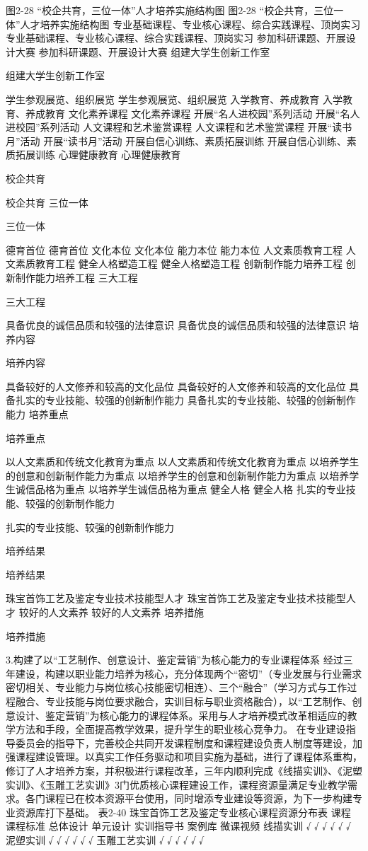 		图2-28   “校企共育，三位一体”人才培养实施结构图
图2-28   “校企共育，三位一体”人才培养实施结构图
专业基础课程、专业核心课程、综合实践课程、顶岗实习
专业基础课程、专业核心课程、综合实践课程、顶岗实习
参加科研课题、开展设计大赛
参加科研课题、开展设计大赛
组建大学生创新工作室

组建大学生创新工作室

学生参观展览、组织展览
学生参观展览、组织展览
入学教育、养成教育
入学教育、养成教育
文化素养课程
文化素养课程
  开展“名人进校园”系列活动
  开展“名人进校园”系列活动
人文课程和艺术鉴赏课程
人文课程和艺术鉴赏课程
开展“读书月”活动
开展“读书月”活动
开展自信心训练、素质拓展训练
开展自信心训练、素质拓展训练
心理健康教育
心理健康教育

校企共育

校企共育
三位一体
 
三位一体
 
德育首位
德育首位
文化本位
文化本位
能力本位
能力本位
人文素质教育工程
人文素质教育工程
健全人格塑造工程
健全人格塑造工程
创新制作能力培养工程
创新制作能力培养工程
三大工程
 
三大工程
 
具备优良的诚信品质和较强的法律意识
具备优良的诚信品质和较强的法律意识
培养内容
 
培养内容
 
具备较好的人文修养和较高的文化品位
具备较好的人文修养和较高的文化品位
具备扎实的专业技能、较强的创新制作能力
具备扎实的专业技能、较强的创新制作能力
培养重点
 
培养重点
 
以人文素质和传统文化教育为重点
以人文素质和传统文化教育为重点
以培养学生的创意和创新制作能力为重点
以培养学生的创意和创新制作能力为重点
以培养学生诚信品格为重点
以培养学生诚信品格为重点
健全人格
健全人格
扎实的专业技能、较强的创新制作能力

扎实的专业技能、较强的创新制作能力

培养结果

培养结果

珠宝首饰工艺及鉴定专业技术技能型人才
珠宝首饰工艺及鉴定专业技术技能型人才
较好的人文素养
较好的人文素养
培养措施

培养措施


  3.构建了以“工艺制作、创意设计、鉴定营销”为核心能力的专业课程体系
 经过三年建设，构建以职业能力培养为核心，充分体现两个“密切”（专业发展与行业需求密切相关、专业能力与岗位核心技能密切相连）、三个“融合”（学习方式与工作过程融合、专业技能与岗位要求融合，实训目标与职业资格融合），以“工艺制作、创意设计、鉴定营销”为核心能力的课程体系。采用与人才培养模式改革相适应的教学方法和手段，全面提高教学效果，提升学生的职业核心竞争力。
在专业建设指导委员会的指导下，完善校企共同开发课程制度和课程建设负责人制度等建设，加强课程建设管理。以真实工作任务驱动和项目实施为基础，进行了课程体系重构，修订了人才培养方案，并积极进行课程改革，三年内顺利完成《线描实训》、《泥塑实训》、《玉雕工艺实训》3门优质核心课程建设工作，课程资源量满足专业教学需求。各门课程已在校本资源平台使用，同时增添专业建设等资源，为下一步构建专业资源库打下基础。
表2-40  珠宝首饰工艺及鉴定专业核心课程资源分布表
课程
课程标准
总体设计
单元设计
实训指导书
案例库
微课视频
线描实训
√
√
√
√
√
√
泥塑实训
√
√
√
√
√
√
玉雕工艺实训
√
√
√
√
√
√


